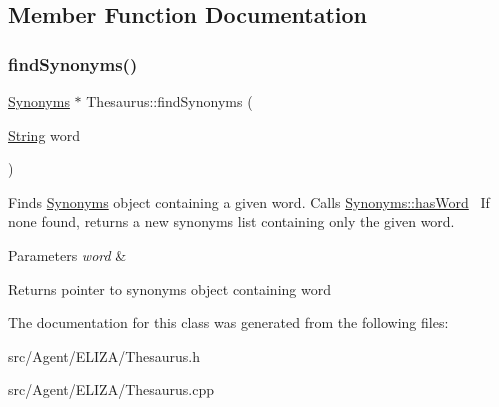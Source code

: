 \subsection{Member Function Documentation}
\mbox{\label{classThesaurus_ab21a3efabe41ac712734cbcc6d7d4414}} 
\subsubsection{\texorpdfstring{find\+Synonyms()}{findSynonyms()}}
{\footnotesize\ttfamily \mbox{\hyperlink{classSynonyms}{Synonyms}} $\ast$ Thesaurus\+::find\+Synonyms (\begin{DoxyParamCaption}\item[{\mbox{\hyperlink{classString}{String}}}]{word }\end{DoxyParamCaption})}

Finds \mbox{\hyperlink{classSynonyms}{Synonyms}} object containing a given word. Calls \mbox{\hyperlink{classSynonyms_a36ffe85c896f9293626deab7d6517b51}{Synonyms\+::has\+Word}}~\newline
If none found, returns a new synonyms list containing only the given word. 
\begin{DoxyParams}{Parameters}
{\em word} & \\
\hline
\end{DoxyParams}
\begin{DoxyReturn}{Returns}
pointer to synonyms object containing word 
\end{DoxyReturn}


The documentation for this class was generated from the following files\+:\begin{DoxyCompactItemize}
\item 
src/\+Agent/\+E\+L\+I\+Z\+A/Thesaurus.\+h\item 
src/\+Agent/\+E\+L\+I\+Z\+A/Thesaurus.\+cpp\end{DoxyCompactItemize}
